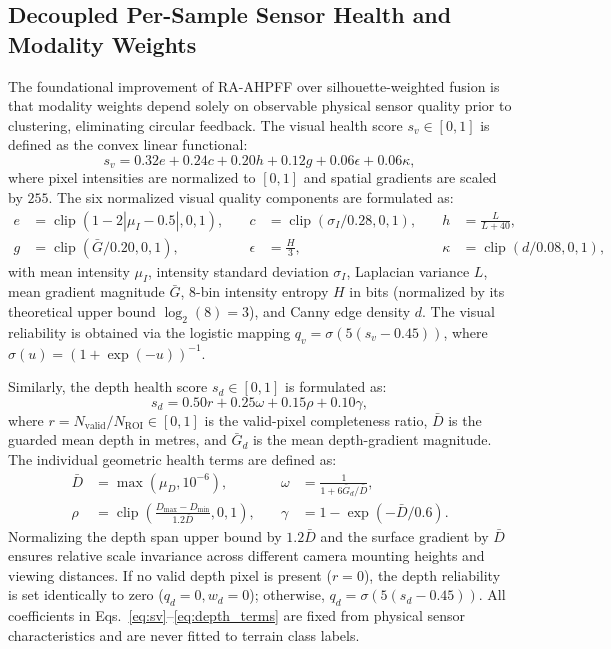 \documentclass[11pt, a4paper]{article}
\begin{document}
\subsection{Decoupled Per-Sample Sensor Health and Modality Weights}
\label{subsec:weights}
The foundational improvement of RA-AHPFF over silhouette-weighted fusion is that modality weights depend solely on observable physical sensor quality prior to clustering, eliminating circular feedback. The visual health score $s_v \in [0,1]$ is defined as the convex linear functional:
\begin{equation}
s_v = 0.32 e + 0.24 c + 0.20 h + 0.12 g + 0.06 \epsilon + 0.06 \kappa,
\label{eq:sv}
\end{equation}
where pixel intensities are normalized to $[0,1]$ and spatial gradients are scaled by $255$. The six normalized visual quality components are formulated as:
\begin{equation}
\begin{aligned}
e &= \operatorname{clip}(1-2|\mu_I-0.5|,0,1), \quad &
c &= \operatorname{clip}(\sigma_I/0.28,0,1), \quad &
h &= \frac{L}{L+40}, \\
g &= \operatorname{clip}(\bar{G}/0.20,0,1), \quad &
\epsilon &= \frac{H}{3}, \quad &
\kappa &= \operatorname{clip}(d/0.08,0,1),
\end{aligned}
\label{eq:visual_terms}
\end{equation}
with mean intensity $\mu_I$, intensity standard deviation $\sigma_I$, Laplacian variance $L$, mean gradient magnitude $\bar{G}$, 8-bin intensity entropy $H$ in bits (normalized by its theoretical upper bound $\log_2(8)=3$), and Canny edge density $d$. The visual reliability is obtained via the logistic mapping $q_v=\sigma(5(s_v-0.45))$, where $\sigma(u) = (1+\exp(-u))^{-1}$.

Similarly, the depth health score $s_d \in [0,1]$ is formulated as:
\begin{equation}
s_d = 0.50 r + 0.25 \omega + 0.15 \rho + 0.10 \gamma,
\label{eq:sd}
\end{equation}
where $r=N_{\mathrm{valid}}/N_{\mathrm{ROI}}\in[0,1]$ is the valid-pixel completeness ratio, $\bar{D}$ is the guarded mean depth in metres, and $\bar{G}_d$ is the mean depth-gradient magnitude. The individual geometric health terms are defined as:
\begin{equation}
\begin{aligned}
\bar{D} &= \max(\mu_D,10^{-6}), \quad &
\omega &= \frac{1}{1+6\bar{G}_d/\bar{D}}, \\
\rho &= \operatorname{clip}\!\left(\frac{D_{\max}-D_{\min}}{1.2\bar{D}},0,1\right), \quad &
\gamma &= 1-\exp(-\bar{D}/0.6).
\end{aligned}
\label{eq:depth_terms}
\end{equation}
Normalizing the depth span upper bound by $1.2\bar{D}$ and the surface gradient by $\bar{D}$ ensures relative scale invariance across different camera mounting heights and viewing distances. If no valid depth pixel is present ($r=0$), the depth reliability is set identically to zero ($q_d = 0, w_d = 0$); otherwise, $q_d=\sigma(5(s_d-0.45))$. All coefficients in Eqs.~\eqref{eq:sv}--\eqref{eq:depth_terms} are fixed from physical sensor characteristics and are never fitted to terrain class labels.
\end{document}
